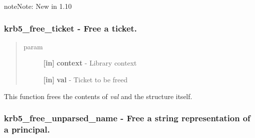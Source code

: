 \documentclass[letterpaper,10pt,english]{sphinxmanual}
\begin{document}
\begin{notice}{note}{Note:}
New in 1.10
\end{notice}


\subsubsection{krb5\_free\_ticket -  Free a ticket.}
\label{appdev/refs/api/krb5_free_ticket:krb5-free-ticket-free-a-ticket}\label{appdev/refs/api/krb5_free_ticket::doc}

\begin{fulllineitems}
\label{appdev/refs/api/krb5_free_ticket:krb5_free_ticket}
\end{fulllineitems}

\begin{quote}\begin{description}
\item[{param}] \leavevmode
\textbf{{[}in{]}} \textbf{context} - Library context

\textbf{{[}in{]}} \textbf{val} - Ticket to be freed

\end{description}\end{quote}

This function frees the contents of \emph{val} and the structure itself.


\subsubsection{krb5\_free\_unparsed\_name -  Free a string representation of a principal.}
\label{appdev/refs/api/krb5_free_unparsed_name::doc}\label{appdev/refs/api/krb5_free_unparsed_name:krb5-free-unparsed-name-free-a-string-representation-of-a-principal}

\begin{fulllineitems}
\label{appdev/refs/api/krb5_free_unparsed_name:krb5_free_unparsed_name}
\end{fulllineitems}
\end{document}
